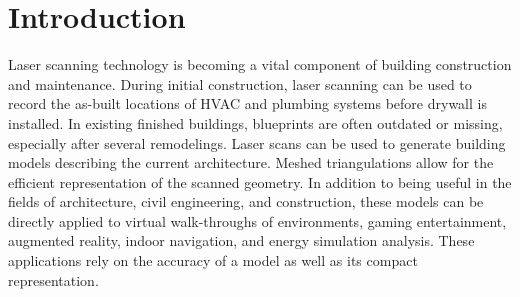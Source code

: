 \documentclass[12pt,onecolumn,oneside]{book}
\begin{document}

\newpage
{}
\setcounter{page}{1}

\chapter{Introduction}
\label{ch:introduction}

Laser scanning technology is becoming a vital component of building construction and maintenance.  During initial construction, laser scanning can be used to record the as-built locations of HVAC and plumbing systems before drywall is installed.  In existing finished buildings, blueprints are often outdated or missing, especially after several remodelings.  Laser scans can be used to generate building models describing the current architecture.  Meshed triangulations allow for the efficient representation of the scanned geometry.  In addition to being useful in the fields of architecture, civil engineering, and construction, these models can be directly applied to virtual walk-throughs of environments, gaming entertainment, augmented reality, indoor navigation, and energy simulation analysis.  These applications rely on the accuracy of a model as well as its compact representation.
\end{document}

